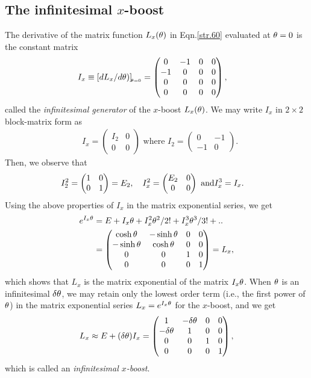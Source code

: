 \begin{small}
\subsection{The infinitesimal {$x$}{}-boost} 
The derivative of the matrix function $L_x({\theta})$ in 
Eqn.\eqref{str.60} evaluated at ${\theta}=0$ is the constant 
matrix
\begin{align}\label{str.52}
I_x \equiv [dL_x/d{\theta})]_{_{\hspace*{-1.5pt}{{\theta}=0}}}
&=\begin{pmatrix}
0 &-1&0&0\\
-1& 0&0&0\\
0&0&0&0\\
0&0&0&0\\
\end{pmatrix},
\end{align}
called the \textsl{infinitesimal generator} of the $x$-boost
$L_x({\theta})$. We may write $I_x$ in  $2\times 2$ block-matrix
form as
\begin{align*}
&I_x=\begin{pmatrix} I_2&0\\0&0\end{pmatrix}
\text{ where }
I_2=\begin{pmatrix} 0&-1\\-1&0\end{pmatrix}.
\end{align*}
Then, we observe that
\begin{align*}
&I_2^2=\begin{pmatrix} 1&0\\0&1\end{pmatrix} =E_2, 
\quad I_x^2=\begin{pmatrix} E_2&0\\0&0\end{pmatrix} 
\text{ and}
\notag  I_x^3=I_x.
\end{align*}
Using the above properties of $I_x$ in the 
matrix exponential series, we get
\begin{align*}
e^{I_x{\theta}}
&=E+I_x{\theta}+I_x^2{\theta}^2/2!+I_x^3{\theta}^3/3!+..\notag\\
&= \begin{pmatrix} \cosh{\theta} & -\sinh{\theta} &0&0\\
-\sinh{\theta} & \cosh{\theta}
&0&0\\0&0&1&0\\0&0&0&1\end{pmatrix} =L_x,
\end{align*}
which shows that $L_x$ is the matrix exponential of the 
matrix $I_x{\theta}$. When ${\theta}$ is an infinitesimal 
$\delta{\theta}$, we may retain only the lowest order term 
(i.e., the first power of ${\theta}$) in the matrix 
exponential series $L_x =e^{I_x{\theta}}$ for the $x$-boost, 
and we get
\begin{align}\label{str.53}
L_x \approx E+(\delta{\theta})
I_x=\begin{pmatrix}
1&-\delta{\theta}&0&0\\-\delta{\theta}&1&0&0\\0&0
&1&0\\0&0&0&1\end{pmatrix} ,
\end{align}
which is called an \textsl{infinitesimal  $x$-boost}.


\end{small}
